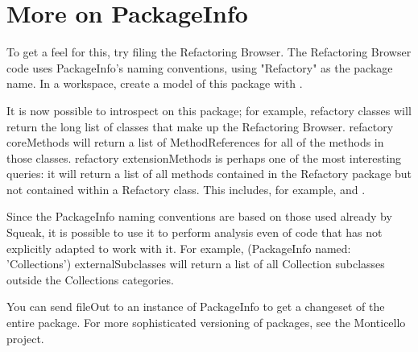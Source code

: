 \documentclass[a4paper,10pt,twoside]{book}
\begin{document}
\section{More on PackageInfo}
To get a feel for this, try filing the Refactoring Browser. The Refactoring Browser code uses PackageInfo's naming conventions, using "Refactory" as the package name. In a workspace, create a model of this package with  . 

It is now possible to introspect on this package; for example, refactory classes will return the long list of classes that make up the Refactoring Browser. refactory coreMethods will return a list of MethodReferences for all of the methods in those classes. refactory extensionMethods is perhaps one of the most interesting queries: it will return a list of all methods contained in the Refactory package but not contained within a Refactory class. This includes, for example,  and .

Since the PackageInfo naming conventions are based on those used already by Squeak, it is possible to use it to perform analysis even of code that has not explicitly adapted to work with it. For example, (PackageInfo named: 'Collections') externalSubclasses will return a list of all Collection subclasses outside the Collections categories.

You can send fileOut to an instance of PackageInfo to get a changeset of the entire package. For more sophisticated versioning of packages, see the Monticello project.


\ifx\wholebook\relax\else
   
   
\end{document}

